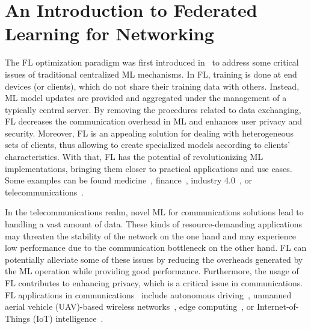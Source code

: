 \documentclass[10pt,a4paper,twocolumn]{article}
\newcommand{\ITUpar}{\vspace{8pt}\par}
\begin{document}
\section{An Introduction to Federated Learning for Networking}
\label{section:federated_learning}

The FL optimization paradigm was first introduced in~\cite{konevcny2016federated} to address some critical issues of traditional centralized ML mechanisms. In FL, training is done at end devices (or clients), which do not share their training data with others. Instead, ML model updates are provided and aggregated under the management of a typically central server. By removing the procedures related to data exchanging, FL decreases the communication overhead in ML and enhances user privacy and security. Moreover, FL is an appealing solution for dealing with heterogeneous sets of clients, thus allowing to create specialized models according to clients' characteristics. With that, FL has the potential of revolutionizing ML implementations, bringing them closer to practical applications and use cases. Some examples can be found medicine~\cite{nguyen2021federated2}, finance~\cite{long2020federated}, industry 4.0~\cite{que2020blockchain}, or telecommunications~\cite{lim2020federated}.\ITUpar

In the telecommunications realm, novel ML for communications solutions lead to handling a vast amount of data. These kinds of resource-demanding applications may threaten the stability of the network on the one hand and may experience low performance due to the communication bottleneck on the other hand. FL can potentially alleviate some of these issues by reducing the overheads generated by the ML operation while providing good performance. Furthermore, the usage of FL contributes to enhancing privacy, which is a critical issue in communications. FL applications in communications~\cite{yang2021federated} include autonomous driving~\cite{li2021privacy}, unmanned aerial vehicle (UAV)-based wireless networks~\cite{brik2020federated}, edge computing~\cite{wang2019inedge}, or Internet-of-Things (IoT) intelligence~\cite{khan2021federated}.\ITUpar
\end{document}
